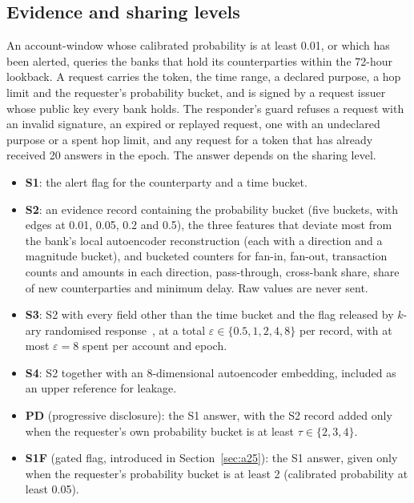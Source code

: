 \documentclass[conference]{IEEEtran}
\begin{document}
\subsection{Evidence and sharing levels}
An account-window whose calibrated probability is at least 0.01, or which has been alerted,
queries the banks that hold its counterparties within the 72-hour lookback. A request carries
the token, the time range, a declared purpose, a hop limit and the requester's probability
bucket, and is signed by a request issuer whose public key every bank holds. The responder's
guard refuses a request with an invalid signature, an expired or replayed request, one with an
undeclared purpose or a spent hop limit, and any request for a token that has already received
20 answers in the epoch. The answer depends on the sharing level.
\begin{itemize}
\item \textbf{S1}: the alert flag for the counterparty and a time bucket.
\item \textbf{S2}: an evidence record containing the probability bucket (five buckets, with
edges at 0.01, 0.05, 0.2 and 0.5), the three features
that deviate most from the bank's local autoencoder reconstruction (each with a direction
and a magnitude bucket), and bucketed counters for fan-in, fan-out, transaction counts and
amounts in each direction, pass-through, cross-bank share, share of new counterparties and
minimum delay. Raw values are never sent.
\item \textbf{S3}: S2 with every field other than the time bucket and the flag released by
$k$-ary randomised response~\cite{warner1965,wang2017ldp}, at a total
$\varepsilon \in \{0.5, 1, 2, 4, 8\}$ per record, with at most $\varepsilon = 8$ spent per
account and epoch.
\item \textbf{S4}: S2 together with an 8-dimensional autoencoder embedding, included as an
upper reference for leakage.
\item \textbf{PD} (progressive disclosure): the S1 answer, with the S2 record added only when
the requester's own probability bucket is at least $\tau \in \{2, 3, 4\}$.
\item \textbf{S1F} (gated flag, introduced in Section~\ref{sec:a25}): the S1 answer, given
only when the requester's probability bucket is at least 2 (calibrated probability at least
0.05).
\end{itemize}
\end{document}
